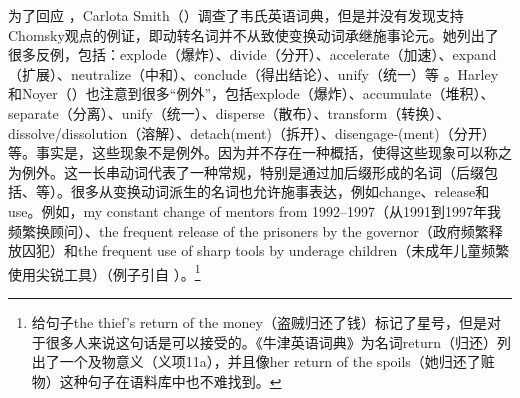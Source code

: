 \begin{exe}
\begin{xlist}[iv.]
\begin{exe}
\begin{xlist}[iv.]
为了回应 ，Carlota Smith（\citeyear{Smith72a-u}）调查了韦氏英语词典，但是并没有发现支持Chomsky观点的例证，即动转名词并不从致使变换动词承继施事论元。她列出了很多反例，包括：explode（爆炸）、divide（分开）、accelerate（加速）、expand（扩展）、neutralize（中和）、conclude（得出结论）、unify（统一）等 \citep[]{Smith72a-u}。Harley和Noyer（\citeyear{HN2000a}）也注意到很多“例外”，包括explode（爆炸）、accumulate（堆积）、separate（分离）、unify（统一）、disperse（散布）、transform（转换）、dissolve/dissolution（溶解）、detach(ment)（拆开）、disengage-(ment)（分开）等。事实是，这些现象不是例外。因为并不存在一种概括，使得这些现象可以称之为例外。这一长串动词代表了一种常规，特别是通过加后缀形成的名词（后缀包括、等）。很多从变换动词派生的名词也允许施事表达，例如change、release和use。例如，my constant change of mentors from 1992--1997（从1991到1997年我频繁换顾问）、the frequent release of the prisoners by the governor（政府频繁释放囚犯）和the frequent use of sharp tools by underage children（未成年儿童频繁使用尖锐工具）（例子引自 \citet[脚注\,13]{Borer2003a-u}）。\footnote{\citet[，例（231）]{Pesetsky96a-u}给句子the thief's return of the money（盗贼归还了钱）标记了星号，但是对于很多人来说这句话是可以接受的。《牛津英语词典》为名词return（归还）列出了一个及物意义（义项11a），并且像her return of the spoils（她归还了赃物）这种句子在语料库中也不难找到。}   


\end{xlist}
\end{exe}
\end{xlist}
\end{exe}
